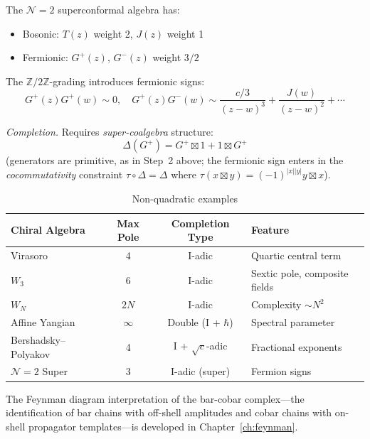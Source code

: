 \begin{example}
\label{ex:n2-superconformal}

The $\mathcal{N}=2$ superconformal algebra has:
\begin{itemize}
\item Bosonic: $T(z)$ weight 2, $J(z)$ weight 1
\item Fermionic: $G^+(z)$, $G^-(z)$ weight $3/2$
\end{itemize}

The $\mathbb{Z}/2\mathbb{Z}$-grading introduces fermionic signs:
\[G^+(z)G^+(w) \sim 0, \quad G^+(z)G^-(w) \sim \frac{c/3}{(z-w)^3} + \frac{J(w)}{(z-w)^2} + \cdots\]

\emph{Completion.} Requires \emph{super-coalgebra} structure:
\[\Delta(G^+) = G^+ \boxtimes 1 + 1 \boxtimes G^+\]
(generators are primitive, as in Step~2 above; the fermionic sign enters in the \emph{cocommutativity} constraint $\tau \circ \Delta = \Delta$ where $\tau(x \boxtimes y) = (-1)^{|x||y|} y \boxtimes x$).
\end{example}


\begin{table}[ht]
\centering
\caption{Non-quadratic examples}
\begin{tabular}{|l|c|c|l|}
\hline
\textbf{Chiral Algebra} & \textbf{Max Pole} & \textbf{Completion Type} & \textbf{Feature} \\
\hline
Virasoro & 4 & I-adic & Quartic central term \\
$W_3$ & 6 & I-adic & Sextic pole, composite fields \\
$W_N$ & $2N$ & I-adic & Complexity $\sim N^2$ \\
Affine Yangian & $\infty$ & Double (I + $\hbar$) & Spectral parameter \\
Bershadsky--Polyakov & 4 & I + $\sqrt{c}$-adic & Fractional exponents \\
$\mathcal{N}=2$ Super & 3 & I-adic (super) & Fermion signs \\
\hline
\end{tabular}
\end{table}

\begin{remark}\label{sec:feynman_genus_g}
The Feynman diagram interpretation of the bar-cobar complex---the identification
of bar chains with off-shell amplitudes and cobar chains with on-shell propagator
templates---is developed in Chapter~\ref{ch:feynman}.
\end{remark}


